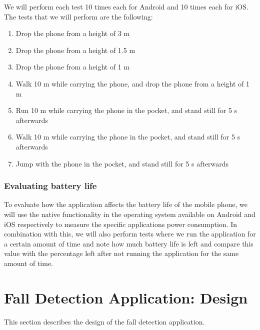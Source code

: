 \documentclass[12pt, a4paper, onecolumn]{article}
\begin{document}
	We will perform each test 10 times each for Android and 10 times each for iOS. The tests that we will perform are the following:
	
	\begin{enumerate}
		\item Drop the phone from a height of 3 m
		\item Drop the phone from a height of 1.5 m
		\item Drop the phone from a height of 1 m
		\item Walk 10 m while carrying the phone, and drop the phone from a height of 1 m
		\item Run 10 m while carrying the phone in the pocket, and stand still for 5 s afterwards
		\item Walk 10 m while carrying the phone in the pocket, and stand still for 5 s afterwards
		\item Jump with the phone in the pocket, and stand still for 5 s afterwards
	\end{enumerate}
	
	\subsubsection{Evaluating battery life}
	
	To evaluate how the application affects the battery life of the mobile phone, we will use the native functionality in the operating system available on Android and iOS respectively to measure the specific applications power consumption.
	In combination with this, we will also perform tests where we run the application for a certain amount of time and note how much battery life is left and compare this value with the percentage left after not running the application for the same amount of time.
	
	\newpage
	\section{Fall Detection Application: Design} \label{section:application-design}
	
	This section describes the design of the fall detection application.
	
\end{document}
